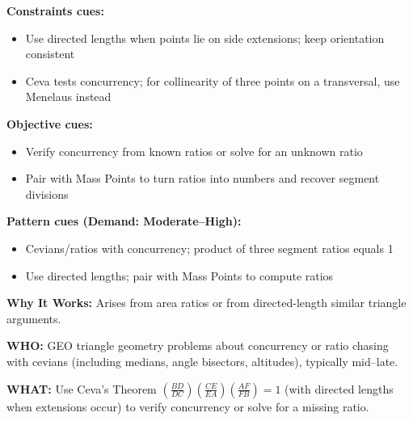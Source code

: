 \documentclass[12pt]{article}
\begin{document}
\textbf{Constraints cues:}
\begin{itemize}
    \item Use directed lengths when points lie on side extensions; keep orientation consistent
    \item Ceva tests concurrency; for collinearity of three points on a transversal, use Menelaus instead
\end{itemize}

\textbf{Objective cues:}
\begin{itemize}
    \item Verify concurrency from known ratios or solve for an unknown ratio
    \item Pair with Mass Points to turn ratios into numbers and recover segment divisions
\end{itemize}

\textbf{Pattern cues (Demand: Moderate–High):}
\begin{itemize}
    \item Cevians/ratios with concurrency; product of three segment ratios equals 1
    \item Use directed lengths; pair with Mass Points to compute ratios
\end{itemize}

\textbf{Why It Works:} Arises from area ratios or from directed-length similar triangle arguments.

\textbf{WHO:} GEO triangle geometry problems about concurrency or ratio chasing with cevians (including medians, angle bisectors, altitudes), typically mid–late.

\textbf{WHAT:} Use Ceva's Theorem $\left(\tfrac{BD}{DC}\right)\!\left(\tfrac{CE}{EA}\right)\!\left(\tfrac{AF}{FB}\right)=1$ (with directed lengths when extensions occur) to verify concurrency or solve for a missing ratio.
\end{document}
